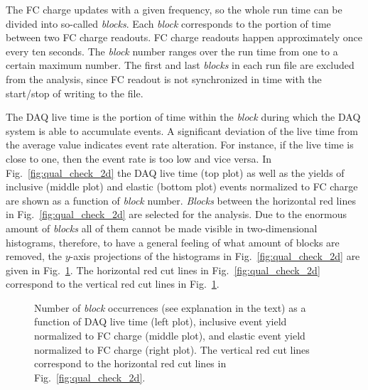 The FC charge updates with a given frequency, so the whole run time can be divided into so-called {\em blocks}. Each {\em block} corresponds to the portion of time between two FC charge readouts. FC charge readouts happen approximately once every ten seconds. The {\em block} number ranges over the run time from one to a certain maximum number. The first and last {\em blocks} in each run file are excluded from the analysis, since FC readout is not synchronized in time with the start/stop of writing to the file.


The DAQ live time is the portion of time within the {\em block} during which the DAQ system is able to accumulate events. A significant deviation of the live time from the average value indicates event rate alteration. For instance, if the live time is close to one, then the event rate is too low and vice versa.
In Fig.~\ref{fig:qual_check_2d} the DAQ live time (top plot) as well as the yields of inclusive (middle plot) and elastic (bottom plot) events normalized to FC charge are shown as a function of {\em block} number. {\em Blocks} between the horizontal red lines in Fig.~\ref{fig:qual_check_2d} are selected for the analysis.
Due to the enormous amount of {\em blocks} all of them cannot be made visible in two-dimensional histograms, therefore, to have a general feeling of what amount of blocks are removed, the $y$-axis projections of the histograms in Fig.~\ref{fig:qual_check_2d} are given in Fig.~\ref{fig:qual_check_1d}. The horizontal red cut lines in Fig.~\ref{fig:qual_check_2d} correspond to the vertical red cut lines in Fig.~\ref{fig:qual_check_1d}.

\afterpage{\clearpage}
\begin{figure}[htp]
\begin{center}
\caption{\small Number of {\em block} occurrences (see explanation in the text) as a function of DAQ live time (left plot), inclusive event yield normalized to FC charge  (middle plot), and  elastic event yield normalized to FC charge (right plot). The vertical red cut lines correspond to the horizontal red cut lines in Fig.~\ref{fig:qual_check_2d}. \label{fig:qual_check_1d}}
\end{center}
\end{figure}



